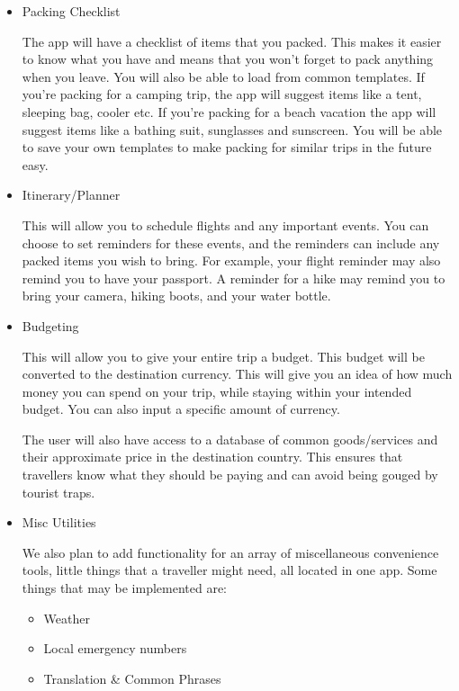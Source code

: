\documentclass[12pt]{article}
\begin{document}
\begin{itemize}

	\item{Packing Checklist}

	The app will have a checklist of items that you packed.
	This makes it easier to know what you have and means that you won't forget to pack anything when you leave.
	You will also be able to load from common templates.
	If you're packing for a camping trip, the app will suggest items like a tent, sleeping bag, cooler etc.
	If you're packing for a beach vacation the app will suggest items like a bathing suit, sunglasses and sunscreen.
	You will be able to save your own templates to make packing for similar trips in the future easy.

	\item{Itinerary/Planner}

	This will allow you to schedule flights and any important events.
	You can choose to set reminders for these events, and the reminders can include any packed items you wish to bring.
	For example, your flight reminder may also remind you to have your passport.
	A reminder for a hike may remind you to bring your camera, hiking boots, and your water bottle.

	\item{Budgeting}

	This will allow you to give your entire trip a budget.
	This budget will be converted to the destination currency.
	This will give you an idea of how much money you can spend on your trip,
	while staying within your intended budget.
	You can also input a specific amount of currency.

	The user will also have access to a database of common goods/services and their approximate price in the destination country.
	This ensures that travellers know what they should be paying and can avoid being gouged by tourist traps.

	\item{Misc Utilities}

	We also plan to add functionality for an array of miscellaneous convenience tools,
	little things that a traveller might need, all located in one app.
	Some things that may be implemented are:

	\begin{itemize}
		\item Weather
		\item Local emergency numbers
		\item Translation \& Common Phrases
	\end{itemize}

\end{itemize}
\end{document}
